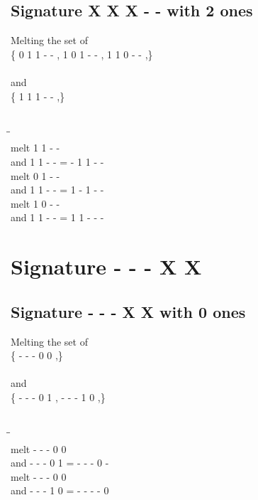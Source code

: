 \documentclass{article}
\begin{document}
\subsection{Signature X X X - - with 2 ones}
Melting the set of\\
\{ 0  1  1  -  - , 1  0  1  -  - , 1  1  0  -  - ,\}\\\\
and\\
\{ 1  1  1  -  - ,\}\\\\
\begin{tabbing}
\hspace{3cm}\=\hspace{3cm}\=\hspace{3cm}\\[1cm]
melt  1  1  -  - \\
and  1  1  -  - \>
 =  -  1  1  -  - \\[1mm]
melt  0  1  -  - \\
and  1  1  -  - \>
 =  1  -  1  -  - \\[1mm]
melt  1  0  -  - \\
and  1  1  -  - \>
 =  1  1  -  -  - \\[1mm]
\end{tabbing}
\newpage
\section{Signature - - - X X }
\subsection{Signature - - - X X with 0 ones}
Melting the set of\\
\{ -  -  -  0  0 ,\}\\\\
and\\
\{ -  -  -  0  1 , -  -  -  1  0 ,\}\\\\
\begin{tabbing}
\hspace{3cm}\=\hspace{3cm}\=\hspace{3cm}\\[1cm]
melt\> -  -  -  0  0 \\
and\> -  -  -  0  1 \>
 =  -  -  -  0  - \\[1mm]
melt\> -  -  -  0  0 \\
and\> -  -  -  1  0 \>
 =  -  -  -  -  0 \\[1mm]
\end{tabbing}
\newpage
\end{document}
